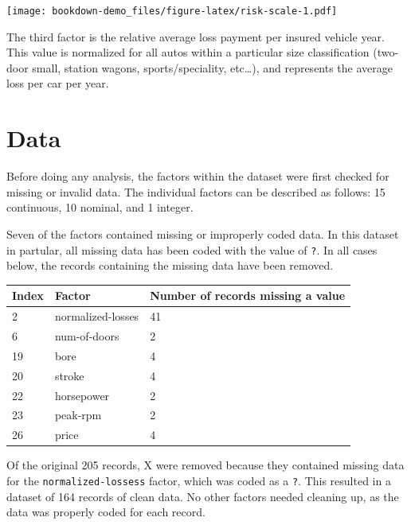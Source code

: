 \documentclass[12pt,openany]{book}
\begin{document}
\texttt{[image: bookdown-demo\_files/figure-latex/risk-scale-1.pdf]}

The third factor is the relative average loss payment per insured
vehicle year. This value is normalized for all autos within a particular
size classification (two-door small, station wagons, sports/speciality,
etc\ldots{}), and represents the average loss per car per year.

\chapter{Data}\label{data}

Before doing any analysis, the factors within the dataset were first
checked for missing or invalid data. The individual factors can be
described as follows: 15 continuous, 10 nominal, and 1 integer.

Seven of the factors contained missing or improperly coded data. In this
dataset in partular, all missing data has been coded with the value of
\texttt{?}. In all cases below, the records containing the missing data
have been removed.

\begin{longtable}[]{@{}lll@{}}
\toprule
Index & Factor & Number of records missing a value\tabularnewline
\midrule
\endhead
2 & normalized-losses & 41\tabularnewline
6 & num-of-doors & 2\tabularnewline
19 & bore & 4\tabularnewline
20 & stroke & 4\tabularnewline
22 & horsepower & 2\tabularnewline
23 & peak-rpm & 2\tabularnewline
26 & price & 4\tabularnewline
\bottomrule
\end{longtable}

Of the original 205 records, X were removed because they contained
missing data for the \texttt{normalized-lossess} factor, which was coded
as a \texttt{?}. This resulted in a dataset of 164 records of clean
data. No other factors needed cleaning up, as the data was properly
coded for each record.
\end{document}
